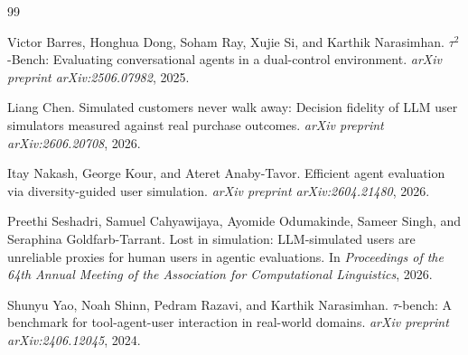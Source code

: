 \documentclass{article}
\begin{document}
\begin{thebibliography}{99}

Victor Barres, Honghua Dong, Soham Ray, Xujie Si, and Karthik Narasimhan.
\newblock $\tau^2$-Bench: Evaluating conversational agents in a dual-control environment.
\newblock \emph{arXiv preprint arXiv:2506.07982}, 2025.

Liang Chen.
\newblock Simulated customers never walk away: Decision fidelity of LLM user
  simulators measured against real purchase outcomes.
\newblock \emph{arXiv preprint arXiv:2606.20708}, 2026.

Itay Nakash, George Kour, and Ateret Anaby-Tavor.
\newblock Efficient agent evaluation via diversity-guided user simulation.
\newblock \emph{arXiv preprint arXiv:2604.21480}, 2026.

Preethi Seshadri, Samuel Cahyawijaya, Ayomide Odumakinde, Sameer Singh, and Seraphina Goldfarb-Tarrant.
\newblock Lost in simulation: LLM-simulated users are unreliable proxies for human users in agentic evaluations.
\newblock In \emph{Proceedings of the 64th Annual Meeting of the Association for Computational Linguistics}, 2026.

Shunyu Yao, Noah Shinn, Pedram Razavi, and Karthik Narasimhan.
\newblock $\tau$-bench: A benchmark for tool-agent-user interaction in real-world domains.
\newblock \emph{arXiv preprint arXiv:2406.12045}, 2024.

\end{thebibliography}
\end{document}
